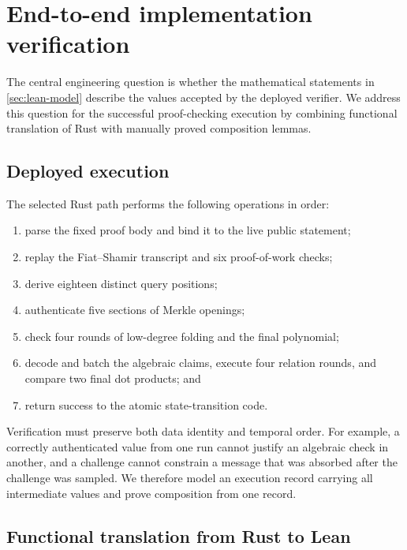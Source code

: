 \section{End-to-end implementation verification}
\label{sec:implementation}

The central engineering question is whether the mathematical statements in
\cref{sec:lean-model} describe the values accepted by the deployed verifier.
We address this question for the successful proof-checking execution by
combining functional translation of Rust with manually proved composition
lemmas.

\subsection{Deployed execution}

The selected Rust path performs the following operations in order:

\begin{enumerate}[leftmargin=*]
  \item parse the fixed proof body and bind it to the live public statement;
  \item replay the Fiat--Shamir transcript and six proof-of-work checks;
  \item derive eighteen distinct query positions;
  \item authenticate five sections of Merkle openings;
  \item check four rounds of low-degree folding and the final polynomial;
  \item decode and batch the algebraic claims, execute four relation rounds,
        and compare two final dot products; and
  \item return success to the atomic state-transition code.
\end{enumerate}

Verification must preserve both data identity and temporal order.  For
example, a correctly authenticated value from one run cannot justify an
algebraic check in another, and a challenge cannot constrain a message that
was absorbed after the challenge was sampled.  We therefore model an
execution record carrying all intermediate values and prove composition from
one record.

\subsection{Functional translation from Rust to Lean}

